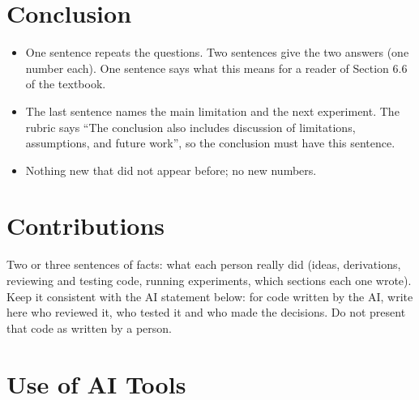 \documentclass{article}
\newenvironment{pts}{\begin{itemize}[nosep,leftmargin=1.15em,topsep=1pt]}{\end{itemize}}
\begin{document}
\section{Conclusion}

\begin{note}
\begin{pts}
\item One sentence repeats the questions. Two sentences give the two answers (one number each). One sentence says what this means for a reader of Section 6.6 of the textbook.
\item The last sentence names the main limitation and the next experiment. The rubric says ``The conclusion also includes discussion of limitations, assumptions, and future work'', so the conclusion must have this sentence.
\item Nothing new that did not appear before; no new numbers.
\end{pts}
\end{note}

\section*{Contributions}

\begin{note}
Two or three sentences of facts: what each person really did (ideas, derivations, reviewing and testing code, running experiments, which sections each one wrote). Keep it consistent with the AI statement below: for code written by the AI, write here who reviewed it, who tested it and who made the decisions. Do not present that code as written by a person.
\end{note}

\section*{Use of AI Tools}
\end{document}
